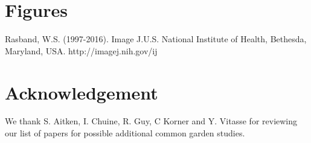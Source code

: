 \documentclass{article}
\begin{document}





\citet{Keir11}



\section{Figures}


Rasband, W.S. (1997-2016). Image J.U.S. National Institute of Health, Bethesda, Maryland, USA.
http://imagej.nih.gov/ij





\section{Acknowledgement}
We thank S. Aitken,  I. Chuine, R. Guy, C Korner and Y. Vitasse for reviewing our list of papers for possible additional common garden studies. 
\end{document}
